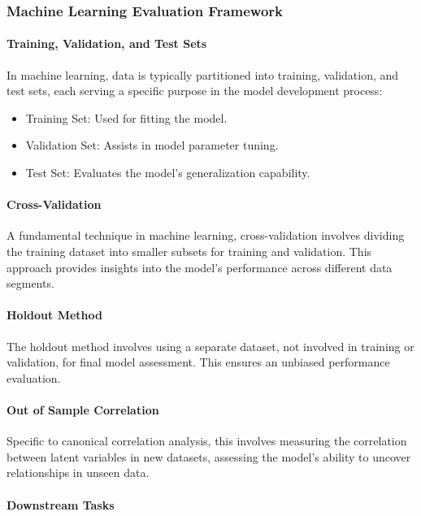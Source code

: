 \subsubsection{Machine Learning Evaluation Framework}

\paragraph{Training, Validation, and Test Sets}

In machine learning, data is typically partitioned into training, validation, and test sets, each serving a specific purpose in the model development process:

\begin{itemize}
    \item Training Set: Used for fitting the model.
    \item Validation Set: Assists in model parameter tuning.
    \item Test Set: Evaluates the model's generalization capability.
\end{itemize}

\paragraph{Cross-Validation}

A fundamental technique in machine learning, cross-validation involves dividing the training dataset into smaller subsets for training and validation. This approach provides insights into the model's performance across different data segments.

\paragraph{Holdout Method}

The holdout method involves using a separate dataset, not involved in training or validation, for final model assessment. This ensures an unbiased performance evaluation.

\paragraph{Out of Sample Correlation}

Specific to canonical correlation analysis, this involves measuring the correlation between latent variables in new datasets, assessing the model's ability to uncover relationships in unseen data.

\paragraph{Downstream Tasks}

